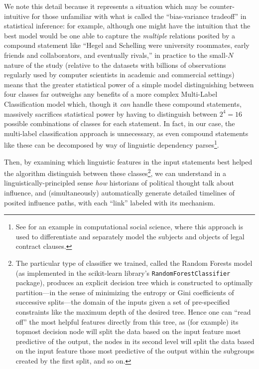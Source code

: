 \documentclass[11pt]{article}
\begin{document}
We note this detail because it represents a situation which may be counter-intuitive for those unfamiliar with what is called the ``bias-variance tradeoff'' in statistical inference: for example, although one might have the intuition that the best model would be one able to capture the \textit{multiple} relations posited by a compound statement like ``Hegel and Schelling were university roommates, early friends and collaborators, and eventually rivals,'' in practice to the small-$N$ nature of the study (relative to the datasets with billions of observations regularly used by computer scientists in academic and commercial settings) means that the greater statistical power of a simple model distinguishing between four classes far outweighs any benefits of a more complex Multi-Label Classification model which, though it \textit{can} handle these compound statements, massively sacrifices statistical power by having to distinguish between $2^4 = 16$ possible combinations of classes for each statement. In fact, in our case, the multi-label classification approach is unnecessary, as even compound statements like these can be decomposed by way of linguistic dependency parses\footnote{See \cite{ash_unsupervised_2020} for an example in computational social science, where this approach is used to differentiate and separately model the subjects and objects of legal contract clauses.}.

Then, by examining which linguistic features in the input statements best helped the algorithm distinguish between these classes\footnote{The particular type of classifier we trained, called the Random Forests model (as implemented in the scikit-learn library's \texttt{RandomForestClassifier} package), produces an explicit decision tree which is constructed to optimally partition---in the sense of minimizing the entropy or Gini coefficients of successive splits---the domain of the inputs given a set of pre-specified constraints like the maximum depth of the desired tree. Hence one can ``read off'' the most helpful features directly from this tree, as (for example) its topmost decision node will split the data based on the input feature most predictive of the output, the nodes in its second level will split the data based on the input feature those most predictive of the output within the subgroups created by the first split, and so on.}, we can understand in a linguistically-principled sense \textit{how} historians of political thought talk about influence, and (simultaneously) automatically generate detailed timelines of posited influence paths, with each ``link'' labeled with its mechanism.
\end{document}
